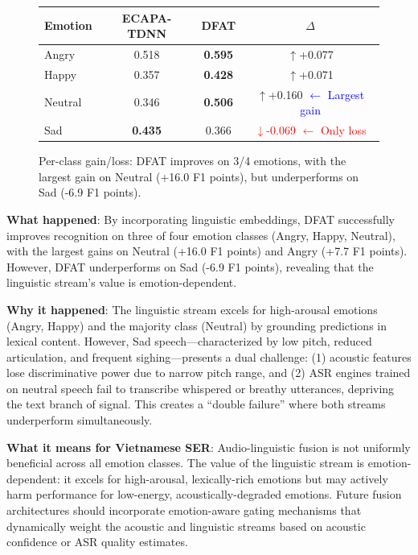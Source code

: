 \documentclass[12pt,a4paper]{report}
\begin{document}
\begin{figure}[h]
\centering
\begin{tcolorbox}[colback=white, colframe=black!50, width=0.8\textwidth]
\centering
\small\sffamily
\begin{tabular}{lccc}
\toprule
\textbf{Emotion} & \textbf{ECAPA-TDNN} & \textbf{DFAT} & \textbf{$\Delta$} \\
\midrule
Angry   & 0.518 & \textbf{0.595} & \textcolor{green!60!black}{$\uparrow$+0.077} \\
Happy   & 0.357 & \textbf{0.428} & \textcolor{green!60!black}{$\uparrow$+0.071} \\
Neutral & 0.346 & \textbf{0.506} & \textcolor{green!60!black}{$\uparrow$+0.160} \quad\textcolor{blue}{\footnotesize $\leftarrow$ Largest gain} \\
Sad     & \textbf{0.435} & 0.366 & \textcolor{red}{$\downarrow$-0.069} \quad\textcolor{red}{\footnotesize $\leftarrow$ Only loss} \\
\bottomrule
\end{tabular}
\end{tcolorbox}
\caption{Per-class gain/loss: DFAT improves on 3/4 emotions, with the largest gain on Neutral (+16.0 F1 points), but underperforms on Sad (-6.9 F1 points).}
\label{fig:perclass_gain_loss}
\end{figure}

\textbf{What happened}: By incorporating linguistic embeddings, DFAT successfully improves recognition on three of four emotion classes (Angry, Happy, Neutral), with the largest gains on Neutral (+16.0 F1 points) and Angry (+7.7 F1 points). However, DFAT underperforms on Sad (-6.9 F1 points), revealing that the linguistic stream's value is emotion-dependent.

\textbf{Why it happened}: The linguistic stream excels for high-arousal emotions (Angry, Happy) and the majority class (Neutral) by grounding predictions in lexical content. However, Sad speech—characterized by low pitch, reduced articulation, and frequent sighing—presents a dual challenge: (1) acoustic features lose discriminative power due to narrow pitch range, and (2) ASR engines trained on neutral speech fail to transcribe whispered or breathy utterances, depriving the text branch of signal. This creates a ``double failure'' where both streams underperform simultaneously.

\textbf{What it means for Vietnamese SER}: Audio-linguistic fusion is not uniformly beneficial across all emotion classes. The value of the linguistic stream is emotion-dependent: it excels for high-arousal, lexically-rich emotions but may actively harm performance for low-energy, acoustically-degraded emotions. Future fusion architectures should incorporate emotion-aware gating mechanisms that dynamically weight the acoustic and linguistic streams based on acoustic confidence or ASR quality estimates.
\end{document}

